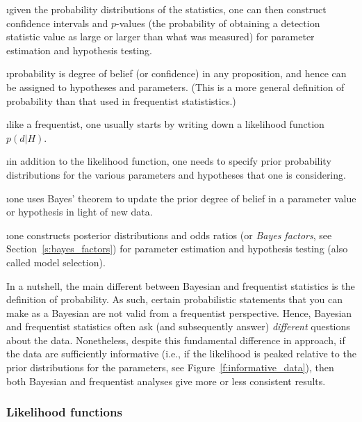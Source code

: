 \i given the probability distributions of the statistics,
one can then construct confidence intervals and 
$p$-values (the probability of obtaining a detection
statistic value as large or larger than what was measured) 
for parameter estimation and hypothesis testing.

\ei


\bi

\i probability is degree of belief (or confidence)
in any proposition, and hence can be assigned to 
hypotheses and parameters.
(This is a more general definition of probability than 
that used in frequentist statististics.)

\i like a frequentist, one usually starts by writing 
down a likelihood function $p(d|H)$.

\i in addition to the likelihood function, one needs to
specify prior probability distributions for the various 
parameters and hypotheses that one is considering.

\i one uses Bayes' theorem to update the prior degree 
of belief in a parameter value or hypothesis in light 
of new data.

\i one constructs posterior distributions and odds 
ratios (or {\em Bayes factors}, see Section~\ref{s:bayes_factors}) 
for parameter estimation and hypothesis testing (also 
called model selection).

\ei
\noindent
In a nutshell, the main different between Bayesian and 
frequentist statistics is the definition of probability.
As such, certain probabilistic statements that you can
make as a Bayesian are not valid from a frequentist perspective.
Hence, Bayesian and frequentist statistics often ask 
(and subsequently answer) {\em different} questions 
about the data.
Nonetheless, despite this fundamental difference in approach,
if the data are sufficiently informative (i.e., if the 
likelihood is peaked relative to the prior distributions 
for the parameters, see Figure~\ref{f:informative_data}), 
then both Bayesian and frequentist analyses give more or 
less consistent results.

\subsubsection{Likelihood functions}
\label{s:likelihood}

